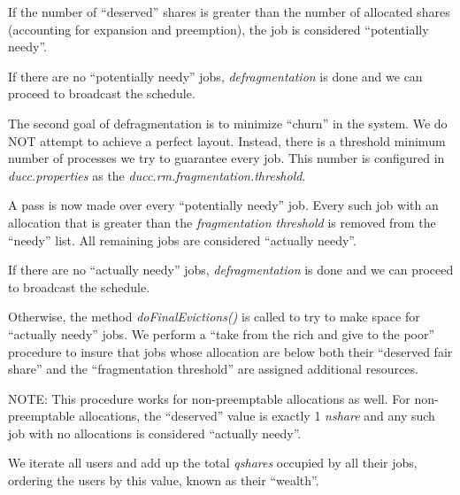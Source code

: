     If the number of ``deserved'' shares is greater than the number of allocated
    shares (accounting for expansion and preemption), the job is considered
    ``potentially needy''.

    If there are no ``potentially needy'' jobs, {\em defragmentation} is done and
    we can proceed to broadcast the schedule.

    The second goal of defragmentation is to minimize ``churn'' in the system.  We
    do NOT attempt to achieve a perfect layout.  Instead, there is a threshold
    minimum number of processes we try to guarantee every job.  This number is configured
    in {\em ducc.properties} as the {\em ducc.rm.fragmentation.threshold}.

    A pass is now made over every ``potentially needy'' job.  Every such job with an
    allocation that is greater than the {\em fragmentation threshold} is removed from the
    ``needy'' list.  All remaining jobs are considered ``actually needy''.

    If there are no ``actually needy'' jobs, {\em defragmentation} is done and we can
    proceed to broadcast the schedule.

    Otherwise, the method {\em doFinalEvictions()} is called to try to make space for
    ``actually needy'' jobs.  We perform a ``take from the rich and give to the poor''
    procedure to insure that jobs whose allocation are below both their ``deserved fair share''
    and the ``fragmentation threshold'' are assigned additional resources.

    NOTE: This procedure works for non-preemptable allocations as well.  For non-preemptable
    allocations, the ``deserved'' value is exactly 1 {\em nshare} and any such job
    with no allocations is considered ``actually needy''.

    We iterate all users and add up the total {\em qshares} occupied by all their jobs,
    ordering the users by this value, known as their ``wealth''.

